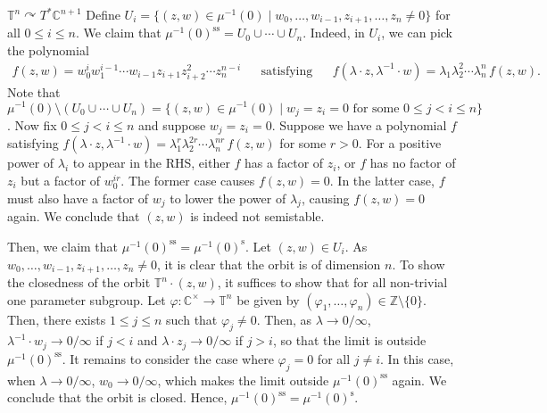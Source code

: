 \documentclass[b5paper]{article}
\newcommand{\acton}{\curvearrowright}
\newcommand{\sstab}{\mathrm{ss}}
\newcommand{\stab}{\mathrm{s}}
\begin{document}
\begin{example}{$\mathbb{T}^n \acton T^*\mathbb{C}^{n+1}$}
    Define $U_i = \{ (z, w) \in \mu^{-1}(0) \mid w_0, \dots, w_{i-1}, z_{i+1}, \dots, z_n \neq 0 \}$ for all $0 \leq i \leq n$. We claim that $\mu^{-1}(0)^\sstab = U_0 \cup \cdots \cup U_n$. Indeed, in $U_i$, we can pick the polynomial
    \begin{align*}
        f(z, w) = w_0^i w_1^{i-1} \cdots w_{i-1} z_{i+1} z_{i+2}^2 \cdots z_n^{n-i} && \text{satisfying} && f(\lambda \cdot z, \lambda^{-1} \cdot w) = \lambda_1 \lambda_2^2 \cdots \lambda_n^n \, f(z, w).
    \end{align*}
    Note that $\mu^{-1}(0) \setminus (U_0 \cup \cdots \cup U_n) = \{ (z, w) \in \mu^{-1}(0) \mid w_j = z_i = 0 \text{ for some } 0 \leq j < i \leq n \}$. Now fix $0 \leq j < i \leq n$ and suppose $w_j = z_i = 0$. Suppose we have a polynomial $f$ satisfying $f(\lambda \cdot z, \lambda^{-1} \cdot w) = \lambda_1^r \lambda_2^{2r} \cdots \lambda_n^{nr} \, f(z, w)$ for some $r>0$. For a positive power of $\lambda_i$ to appear in the RHS, either $f$ has a factor of $z_i$, or $f$ has no factor of $z_i$ but a factor of $w_0^{ir}$. The former case causes $f(z, w)=0$. In the latter case, $f$ must also have a factor of $w_j$ to lower the power of $\lambda_j$, causing $f(z, w)=0$ again. We conclude that $(z, w)$ is indeed not semistable.

    Then, we claim that $\mu^{-1}(0)^\sstab = \mu^{-1}(0)^\stab$. Let $(z, w) \in U_i$. As $w_0, \dots, w_{i-1}, z_{i+1}, \dots, z_n \neq 0$, it is clear that the orbit is of dimension $n$. To show the closedness of the orbit $\mathbb{T}^n \cdot (z, w)$, it suffices to show that for all non-trivial one parameter subgroup. Let $\varphi : \mathbb{C}^\times \to \mathbb{T}^n$ be given by $(\varphi_1, \dots, \varphi_n) \in \mathbb{Z} \setminus \{ 0 \}$. Then, there exists $1 \leq j \leq n$ such that $\varphi_j \neq 0$. Then, as $\lambda \to 0/\infty$, $\lambda^{-1} \cdot w_j \to 0/\infty$ if $j<i$ and $\lambda \cdot z_j \to 0/\infty$ if $j>i$, so that the limit is outside $\mu^{-1}(0)^\sstab$. It remains to consider the case where $\varphi_j=0$ for all $j\neq i$. In this case, when $\lambda \to 0/\infty$, $w_0 \to 0/\infty$, which makes the limit outside $\mu^{-1}(0)^\sstab$ again. We conclude that the orbit is closed. Hence, $\mu^{-1}(0)^\sstab = \mu^{-1}(0)^\stab$.


\end{example}
\end{document}
